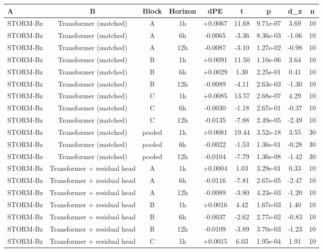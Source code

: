 \begin{tabular}{lcccccccc}
\toprule
A & B & Block & Horizon & dPE & t & p & d\_z & n \\
\midrule
STORM-Bz & Transformer (matched) & A & 1h & +0.0067 & 11.68 & 9.71e-07 & 3.69 & 10 \\
STORM-Bz & Transformer (matched) & A & 6h & -0.0065 & -3.36 & 8.36e-03 & -1.06 & 10 \\
STORM-Bz & Transformer (matched) & A & 12h & -0.0087 & -3.10 & 1.27e-02 & -0.98 & 10 \\
STORM-Bz & Transformer (matched) & B & 1h & +0.0091 & 11.50 & 1.10e-06 & 3.64 & 10 \\
STORM-Bz & Transformer (matched) & B & 6h & +0.0029 & 1.30 & 2.25e-01 & 0.41 & 10 \\
STORM-Bz & Transformer (matched) & B & 12h & -0.0089 & -4.11 & 2.63e-03 & -1.30 & 10 \\
STORM-Bz & Transformer (matched) & C & 1h & +0.0085 & 13.57 & 2.68e-07 & 4.29 & 10 \\
STORM-Bz & Transformer (matched) & C & 6h & -0.0030 & -1.18 & 2.67e-01 & -0.37 & 10 \\
STORM-Bz & Transformer (matched) & C & 12h & -0.0135 & -7.88 & 2.49e-05 & -2.49 & 10 \\
STORM-Bz & Transformer (matched) & pooled & 1h & +0.0081 & 19.44 & 3.52e-18 & 3.55 & 30 \\
STORM-Bz & Transformer (matched) & pooled & 6h & -0.0022 & -1.53 & 1.36e-01 & -0.28 & 30 \\
STORM-Bz & Transformer (matched) & pooled & 12h & -0.0104 & -7.79 & 1.36e-08 & -1.42 & 30 \\
STORM-Bz & Transformer + residual head & A & 1h & +0.0004 & 1.03 & 3.29e-01 & 0.33 & 10 \\
STORM-Bz & Transformer + residual head & A & 6h & -0.0116 & -7.81 & 2.67e-05 & -2.47 & 10 \\
STORM-Bz & Transformer + residual head & A & 12h & -0.0089 & -3.80 & 4.23e-03 & -1.20 & 10 \\
STORM-Bz & Transformer + residual head & B & 1h & +0.0016 & 4.42 & 1.67e-03 & 1.40 & 10 \\
STORM-Bz & Transformer + residual head & B & 6h & -0.0037 & -2.62 & 2.77e-02 & -0.83 & 10 \\
STORM-Bz & Transformer + residual head & B & 12h & -0.0109 & -3.89 & 3.70e-03 & -1.23 & 10 \\
STORM-Bz & Transformer + residual head & C & 1h & +0.0015 & 6.03 & 1.95e-04 & 1.91 & 10 \\

\end{tabular}
